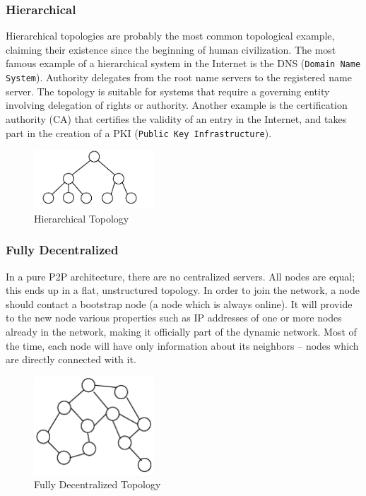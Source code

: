 \subsubsection{Hierarchical}

Hierarchical topologies are probably the most common topological example,
claiming their existence since the beginning of human civilization. The most
famous example of a hierarchical system in the Internet is the DNS
(\texttt{Domain Name System}). Authority delegates from the root name servers
to the registered name server. The topology is suitable for systems that
require a governing entity involving delegation of rights or authority.
Another example is the certification authority (CA) that certifies the
validity of an entry in the Internet, and takes part in the creation of a PKI
(\texttt{Public Key Infrastructure}).

\begin{figure}
  \centering
  \includegraphics[width=0.4\textwidth]{src/img/p2p-systems/hierarchical}
  \caption{Hierarchical Topology}
  \label{fig:p2p-systems:hierarchical}
\end{figure}

\subsubsection{Fully Decentralized}

In a pure P2P architecture, there are no centralized servers. All nodes are
equal; this ends up in a flat, unstructured topology. In order to join the
network, a node should contact a bootstrap node (a node which is always online).
It will provide to the new node various properties such as IP addresses of one
or more nodes already in the network, making it officially part of the dynamic
network. Most of the time, each node will have only information about its
neighbors -- nodes which are directly connected with it.

\begin{figure}
  \centering
  \includegraphics[width=0.4\textwidth]{src/img/p2p-systems/decentralized}
  \caption{Fully Decentralized Topology}
  \label{fig:p2p-systems:decentralized}
\end{figure}

